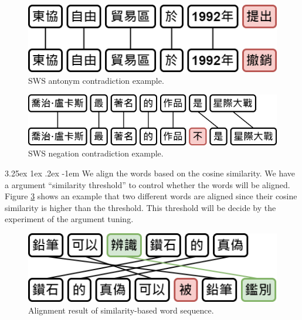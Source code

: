 \documentclass[12pt]{article}
\makeatletter
\renewcommand\paragraph{\@startsection{paragraph}{5}{\z@}%
  {3.25ex \@plus1ex \@minus.2ex}%
  {-1em}%
  {\normalfont\normalsize\bfseries}}
\makeatother
\begin{document}
\begin{CJK*}{UTF8}{bkai}
\begin{spacing}{1.77}
\hspace*{-1.5in}
\begin{figure}[H]
  \centering
  \includegraphics[scale=0.6]{SWS.C.Antonym}
  \caption[SWS Antonym Contradiction Example]{SWS antonym contradiction example.}
  \label{fig:sws_c_antonym}
\end{figure}

\begin{figure}[H]
  \centering
  \includegraphics[scale=0.6]{SWS.C.Negation.png}
  \caption[SWS Negation Contradiction Example]{SWS negation contradiction example.}
  \label{fig:sws_c_neg}
\end{figure}


\paragraph{}
We align the words based on the cosine similarity. We have a argument ``similarity threshold'' to control whether the words will be aligned. Figure \ref{fig:sim_threshold} shows an example that two different words are aligned since their cosine similarity is higher than the threshold. This threshold will be decide by the experiment of the argument tuning.

\hspace*{-1.5in}
\begin{figure}[H]
  \centering
  \includegraphics[scale=0.6]{Threshold.png}
  \caption[SWS Alignment Result with Threshold]{Alignment result of similarity-based word sequence.}
  \label{fig:sim_threshold}
\end{figure}


\end{spacing}
\end{CJK*}
\end{document}
